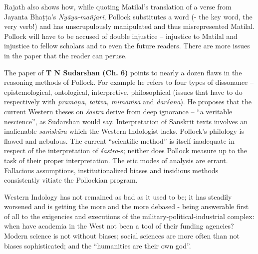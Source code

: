 Rajath also shows how, while quoting Matilal’s translation of a verse from Jayanta Bhaṭṭa’s {\sl Nyāya-mañjarī}, Pollock substitutes a word (- the key word, the very verb!) and has unscrupulously manipulated and thus misrepresented Matilal. Pollock will have to be accused of double injustice -- injustice to Matilal and injustice to fellow scholars and to even the future readers. There are more issues in the paper that the reader can peruse.

The paper of {\bf T N Sudarshan (Ch. 6)} points to nearly a dozen flaws in the reasoning methods of Pollock. For example he refers to four types of dissonance -- epistemological, ontological, interpretive, philosophical (issues that have to do respectively with {\sl pramāṇa, tattva, mīmāṁsā} and {\sl darśana}). He proposes that the current Western theses on {\sl śāstra} derive from deep ignorance -- “a veritable nescience”, as Sudarshan would say. Interpretation of Sanskrit texts involves an inalienable {\sl saṁskāra} which the Western Indologist lacks. Pollock’s philology is flawed and nebulous. The current “scientific method” is itself inadequate in respect of the interpretation of {\sl śāstra}-s; neither does Pollock measure up to the task of their proper interpretation. The etic modes of analysis are errant. Fallacious assumptions, institutionalized biases and insidious methods consistently vitiate the Pollockian program.

Western Indology has not remained as bad as it used to be; it has steadily worsened and is getting the more and the more debased - being answerable first of all to the exigencies and executions of the military-political-industrial complex: when have academia in the West not been a tool of their funding agencies? Modern science is not without biases; social sciences are more often than not biases sophisticated; and the “humanities are their own god”.

